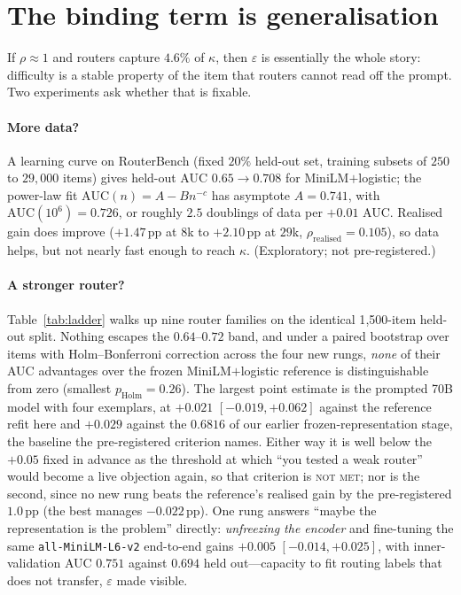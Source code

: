 \documentclass[10pt]{article}
\newcommand{\pp}{\,\text{pp}}
\begin{document}
\section{The binding term is generalisation}\label{sec:eps}

If $\rho\approx1$ and routers capture $4.6\%$ of $\kappa$, then $\varepsilon$ is
essentially the whole story: difficulty is a stable property of the item that
routers cannot read off the prompt. Two experiments ask whether that is fixable.

\paragraph{More data?} A learning curve on RouterBench (fixed $20\%$ held-out
set, training subsets of $250$ to $29{,}000$ items) gives held-out AUC
$0.65\!\to\!0.708$ for MiniLM$+$logistic; the power-law fit
$\mathrm{AUC}(n)=A-Bn^{-c}$ has asymptote $A=0.741$, with
$\mathrm{AUC}(10^6)=0.726$, or roughly $2.5$ doublings of data per $+0.01$ AUC.
Realised gain does improve ($+1.47\pp$ at $8$k to $+2.10\pp$ at $29$k,
$\rho_{\text{realised}}=0.105$), so data helps, but not nearly fast enough to
reach $\kappa$. (Exploratory; not pre-registered.)

\paragraph{A stronger router?} Table~\ref{tab:ladder} walks up nine router
families on the identical 1{,}500-item held-out split. Nothing escapes the
$0.64$--$0.72$ band, and under a paired bootstrap over items with
Holm--Bonferroni correction across the four new rungs, \emph{none} of their AUC
advantages over the frozen MiniLM$+$logistic reference is distinguishable from
zero (smallest $p_{\text{Holm}} = 0.26$). The largest point estimate is the
prompted 70B model with four exemplars, at $+0.021$ $[-0.019, +0.062]$ against
the reference refit here and $+0.029$ against the $0.6816$ of our earlier
frozen-representation stage, the baseline the pre-registered criterion names.
Either way it is well below the $+0.05$ fixed in advance as the threshold at
which ``you tested a weak router'' would become a live objection again, so that
criterion is \textsc{not met}; nor is the second, since no new rung beats the
reference's realised gain by the pre-registered $1.0\pp$ (the best manages
$-0.022\pp$). One rung answers ``maybe the representation is the problem''
directly: \emph{unfreezing the encoder} and fine-tuning the same
\texttt{all-MiniLM-L6-v2} end-to-end gains $+0.005$ $[-0.014, +0.025]$, with
inner-validation AUC $0.751$ against $0.694$ held out---capacity to fit routing
labels that does not transfer, $\varepsilon$ made visible.
\end{document}
